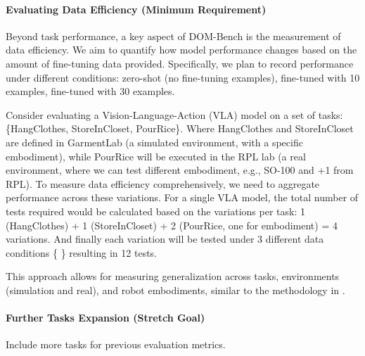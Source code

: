 \paragraph{\textbf{Evaluating Data Efficiency} (Minimum Requirement) }

Beyond task performance, a key aspect of DOM-Bench is the measurement of data efficiency. We aim to quantify how model performance changes based on the amount of fine-tuning data provided. Specifically, we plan to record performance under different conditions: zero-shot (no fine-tuning examples), fine-tuned with 10 examples, fine-tuned with 30 examples.

\begin{domexample}
Consider evaluating a Vision-Language-Action (VLA) model on a set of tasks: \{HangClothes, StoreInCloset, PourRice\}. Where HangClothes and StoreInCloset are defined in GarmentLab (a simulated environment, with a specific embodiment), while PourRice will be executed in the RPL lab (a real environment, where we can test different embodiment, e.g., SO-100 and +1 from RPL). To measure data efficiency comprehensively, we need to aggregate performance across these variations. For a single VLA model, the total number of tests required would be calculated based on the variations per task: 1 (HangClothes) + 1 (StoreInCloset) + 2 (PourRice, one for embodiment) = 4 variations. And finally each variation will be tested under 3 different data conditions \{  \} resulting in 12 tests.
\end{domexample}



This approach allows for measuring generalization across tasks, environments (simulation and real), and robot embodiments, similar to the methodology in \cite{TransferWelle}.

\paragraph{\textbf{Further Tasks Expansion} (Stretch Goal)} 
Include more tasks for previous evaluation metrics.


